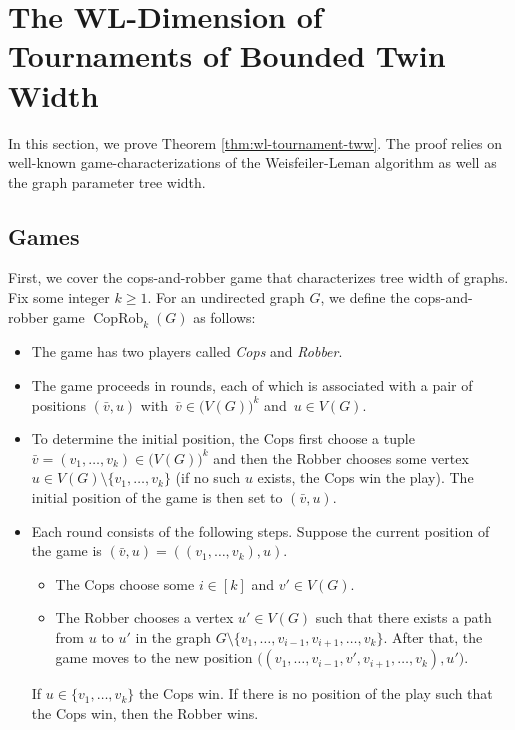 \documentclass{theoretics}
\DeclareMathOperator{\CopRob}{CopRob}
\begin{document}
\section{The WL-Dimension of Tournaments of Bounded Twin Width}
\label{sec:wl}

In this section, we prove Theorem \ref{thm:wl-tournament-tww}.
The proof relies on well-known game-characterizations of the Weisfeiler-Leman algorithm as well as the graph parameter tree width.

\subsection{Games}

First, we cover the cops-and-robber game that characterizes tree width of graphs.
Fix some integer $k \geq 1$.
For an undirected graph $G$, we define the cops-and-robber game $\CopRob_k(G)$ as follows:

\begin{itemize}
 \item The game has two players called \emph{Cops} and \emph{Robber}.
 \item The game proceeds in rounds, each of which is associated with a pair of positions
 $(\bar v,u)$ with~$\bar v \in \big(V(G)\big)^k$ and~$u \in V(G)$.
 \item To determine the initial position, the Cops first choose a tuple $\bar v = (v_1,\dots,v_k) \in \big(V(G)\big)^k$ and then the Robber chooses some vertex $u \in V(G) \setminus \{v_1,\dots,v_k\}$ (if no such $u$ exists, the Cops win the play).
  The initial position of the game is then set to $(\bar v,u)$.
 \item Each round consists of the following steps.
  Suppose the current position of the game is $(\bar v,u) = ((v_1,\dots,v_k),u)$.
  \begin{itemize}
   \item[(C)] The Cops choose some $i \in [k]$ and $v' \in V(G)$.
   \item[(R)] The Robber chooses a vertex $u' \in V(G)$ such that there exists a path from $u$ to $u'$ in the graph $G \setminus \{v_1,\dots,v_{i-1},v_{i+1},\dots,v_k\}$.
    After that, the game moves to the new position $\big((v_1,\dots,v_{i-1},v',v_{i+1},\dots,v_k), u'\big)$.
  \end{itemize}

  If $u \in \{v_1,\dots,v_k\}$ the Cops win.
  If there is no position of the play such that the Cops win, then the Robber wins.
\end{itemize}
\end{document}
